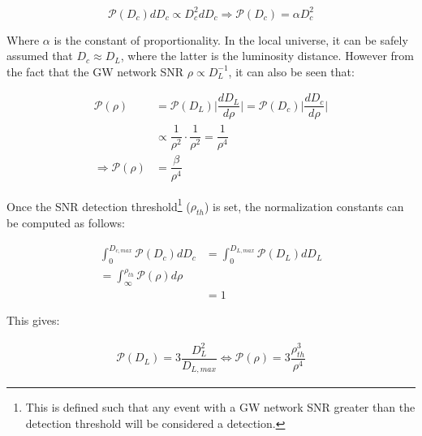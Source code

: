         \begin{equation}
            \mathcal{P}(D_c) dD_c \propto D_c^2 dD_c \Rightarrow
                \boxed{\mathcal{P}(D_c) = \alpha D_c^2}
        \end{equation}

        Where $\alpha$ is the constant of proportionality. In the local universe, it can
        be safely assumed that $D_c \approx D_L$, where the latter is the luminosity
        distance.  However from the fact that the GW network SNR $\rho \propto
        D_L^{-1}$, it can also be seen that:

        \begin{align}
            \mathcal{P}(\rho) &= \mathcal{P}(D_L)
                                    \bigg \lvert \dfrac{dD_L}{d\rho} \bigg \rvert
                                    = \mathcal{P}({D_c})
                                    \bigg \lvert \dfrac{dD_c}{d\rho} \bigg \rvert
                                    \nonumber \\
                              &\propto \dfrac{1}{\rho^2} \cdot \dfrac{1}{\rho^2}
                                  = \dfrac{1}{\rho^4} \nonumber\\
            \Rightarrow \mathcal{P} (\rho) &= \dfrac{\beta}{\rho^4}
        \end{align}

        Once the SNR detection threshold\footnote{
            This is defined such that any event with a GW network SNR greater than the
            detection threshold will be considered a detection.
        } ($\rho_{th}$) is set, the normalization constants can be computed as follows:

        \begin{align}
            \int_0^{D_{c, max}}
                \mathcal{P}(D_c) dD_c &= \int_0^{D_{L, max}} \mathcal{P}(D_L) dD_L \\
                                      = \int_\infty^{\rho_{th}} \mathcal{P}(\rho)
                                          d\rho \\
                                      &= 1
        \end{align}

        This gives:

        \begin{align}
            \label{eq:lum_dist}
            \mathcal{P}(D_L) = 3 \dfrac{D_L^2}{D_{L, max}}
                                 \Leftrightarrow
            \mathcal{P}(\rho) = 3 \dfrac{\rho_{th}^3}{\rho^4}
        \end{align}

